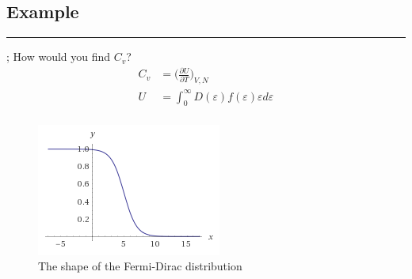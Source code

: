 \documentclass[a4paper, 11pt]{article}
\begin{document}
\subsection*{Example} 
	\par\noindent\rule{\textwidth}{0.4pt};
	How would you find $C_v$? 
		\begin{align*}
			C_v &= \Big(\frac{\partial U}{\partial T}\Big)_{V,N} \\ 
			U &= \int_0^\infty D(\varepsilon)f(\varepsilon)\varepsilon d\varepsilon \\ 
		\end{align*}
	\begin{figure}[!hbt]
		\centering
		\includegraphics[scale = 1.0]{fermiDirac}
		\caption{The shape of the Fermi-Dirac distribution}
	\end{figure}
\end{document}
